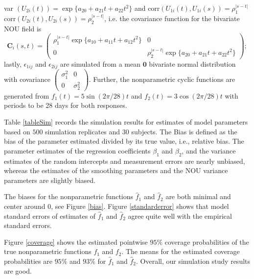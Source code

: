 \documentclass[12pt, notitlepage]{article}
\begin{document}
var
$
(U_{2i}(t)) = \exp\{a_{20} + a_{21}t + a_{22}t^2 \}
$
and 
corr$(U_{1i} (t), U_{1i}(s)) = \rho_1^{|s-t|}$
corr$(U_{2i} (t), U_{2i}(s)) = \rho_2^{|s-t|}$, i.e. the covariance function for the bivariate NOU field is 
\[
\boldsymbol C_i(s, t)
= 
\begin{pmatrix}
\rho_1^{|s-t|} \exp\{a_{10} + a_{11}t + a_{12}t^2 \} &  0  \\
0 & \rho_2^{|s-t|}\exp\{a_{20} + a_{21}t + a_{22}t^2 \}
\end{pmatrix};
\]
lastly, 
$\epsilon_{1ij}$ and $\epsilon_{2ij}$ are simulated from a mean $\bm 0$ bivariate normal distribution with covariance 
$\begin{pmatrix}
\sigma_1^2 & 0  \\
0 &   \sigma_2^2 
\end{pmatrix}$.
Further, the nonparametric cyclic functions are generated from 
$f_1 (t) = 5 \sin\left({2\pi / 28}\right)t$ and
$f_2 (t) = 3 \cos\left({2\pi / 28}\right)t$
with periods to be 28 days for both responses. 


Table \ref{tableSim} records the simulation results for estimates of model parameters based on $500$ simulation replicates and $30$ subjects. The Bias is defined as the bias of the parameter estimated divided by its true value, i.e., relative bias. 
The parameter estimates of the regression coefficients $\beta_1$ and $\beta_2$, and the variance estimates of the random intercepts and measurement errors are nearly unbiased, whereas the estimates of the smoothing parameters and the NOU variance parameters are slightly biased. 


The biases for the nonparametric functions  $\hat f_1$ and $\hat f_2$ are both minimal and center around $0$, see Figure \ref{bias}. Figure \ref{standarderror} shows that model standard errors of estimates of $\hat f_1$ and $\hat f_2$ agree quite well with the empirical standard errors. 


Figure \ref{coverage} shows the estimated pointwise $95\%$ coverage probabilities of the true nonparametric functions $f_1$ and $f_2$. The means for the estimated coverage probabilities are $95\%$ and $93\%$ for  $\hat f_1$ and $\hat f_2$. Overall, our simulation study results are good.
\end{document}
